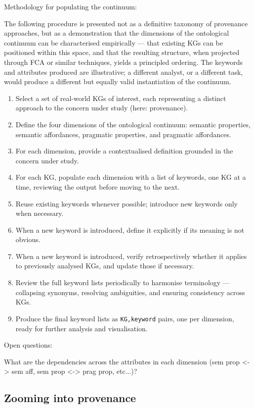 \documentclass[runningheads]{llncs}
\begin{document}
Methodology for populating the continuum:

The following procedure is presented not as a definitive taxonomy of provenance approaches, but as a demonstration that the dimensions of the ontological continuum can be characterised empirically --- that existing KGs can be positioned within this space, and that the resulting structure, when projected through FCA or similar techniques, yields a principled ordering. The keywords and attributes produced are illustrative; a different analyst, or a different task, would produce a different but equally valid instantiation of the continuum.

\begin{enumerate}
    \item Select a set of real-world KGs of interest, each representing a distinct approach to the concern under study (here: provenance).
    \item Define the four dimensions of the ontological continuum: semantic properties, semantic affordances, pragmatic properties, and pragmatic affordances.
    \item For each dimension, provide a contextualised definition grounded in the concern under study.
    \item For each KG, populate each dimension with a list of keywords, one KG at a time, reviewing the output before moving to the next.
    \item Reuse existing keywords whenever possible; introduce new keywords only when necessary.
    \item When a new keyword is introduced, define it explicitly if its meaning is not obvious.
    \item When a new keyword is introduced, verify retrospectively whether it applies to previously analysed KGs, and update those if necessary.
    \item Review the full keyword lists periodically to harmonise terminology --- collapsing synonyms, resolving ambiguities, and ensuring consistency across KGs.
    \item Produce the final keyword lists as \texttt{KG,keyword} pairs, one per dimension, ready for further analysis and visualisation.
\end{enumerate}

Open questions:

What are the dependencies across the attributes in each dimension (sem prop <-> sem aff, sem prop <-> prag prop, etc...)?


\subsection{Zooming into provenance}
\end{document}
